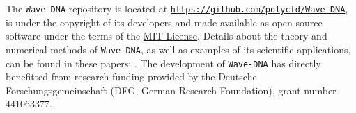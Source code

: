 The {\tt Wave-DNA} repository is located at \href{https://github.com/polycfd/Wave-DNA}{\texttt{https://github.com/polycfd/Wave-DNA}}, is under the copyright of its developers and made available as open-source software under the terms of the \href{https://opensource.org/license/mit/}{MIT License}. Details about the theory and numerical methods of {\tt Wave-DNA}, as well as examples of its scientific applications, can be found in these papers: \citep{Schenke_et_al_2022, Schenke_et_al_2022_PoF, Schenke_et_al_2023_JASA}.
The development of {\tt Wave-DNA} has directly benefitted from research funding provided by the Deutsche Forschungsgemeinschaft (DFG, German Research Foundation), grant number 441063377.


